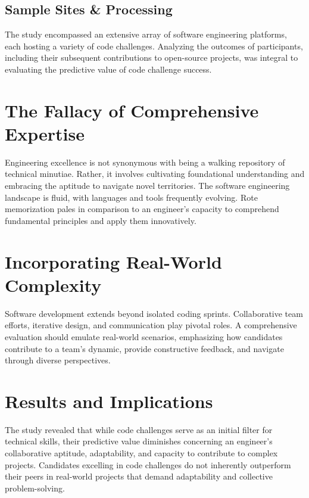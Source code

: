 \documentclass[
    a4paper, %
    10pt, %
    unnumberedsections, %
    twoside, %
]{LTJournalArticle}
\begin{document}
\subsection{Sample Sites \& Processing}

The study encompassed an extensive array of software engineering platforms, each hosting a variety of code challenges. Analyzing the outcomes of participants, including their subsequent contributions to open-source projects, was integral to evaluating the predictive value of code challenge success.


\section{The Fallacy of Comprehensive Expertise}

Engineering excellence is not synonymous with being a walking repository of technical minutiae. Rather, it involves cultivating foundational understanding and embracing the aptitude to navigate novel territories. The software engineering landscape is fluid, with languages and tools frequently evolving. Rote memorization pales in comparison to an engineer's capacity to comprehend fundamental principles and apply them innovatively.

\section{Incorporating Real-World Complexity}

Software development extends beyond isolated coding sprints. Collaborative team efforts, iterative design, and communication play pivotal roles. A comprehensive evaluation should emulate real-world scenarios, emphasizing how candidates contribute to a team's dynamic, provide constructive feedback, and navigate through diverse perspectives.


\section{Results and Implications}

The study revealed that while code challenges serve as an initial filter for technical skills, their predictive value diminishes concerning an engineer's collaborative aptitude, adaptability, and capacity to contribute to complex projects. Candidates excelling in code challenges do not inherently outperform their peers in real-world projects that demand adaptability and collective problem-solving.
\end{document}
